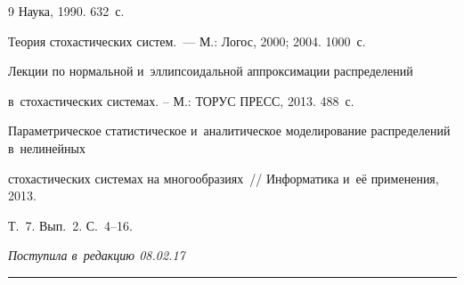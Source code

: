 {{\begin{thebibliography}{9}
Наука,  1990.  632~с. 




 





Теория стохастических систем.~--- М.: Логос, 2000; 2004. 1000~с.







Лекции по нормальной и~эллипсоидальной аппроксимации распределений 

в~стохастических системах. -- М.: ТОРУС ПРЕСС, 2013. 488~с.





Параметрическое статистическое и~аналитическое моделирование распределений в~нелинейных 

стохастических системах на многообразиях~/\!\!/ Информатика и~её применения, 2013. 

Т.~7. Вып.~2. С.~4--16.

       \end{thebibliography}

} }





\vspace*{-3pt}



\hfill{\small\textit{Поступила в~редакцию 08.02.17}}









\vspace*{9pt}



\hrule







